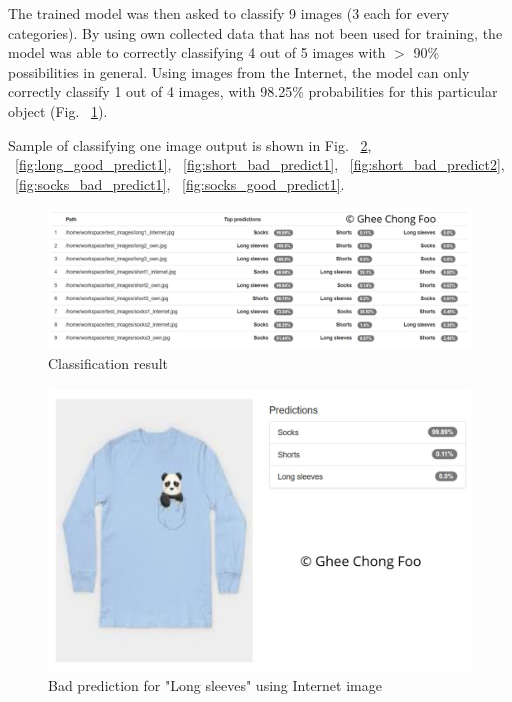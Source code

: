 \documentclass[10pt,journal,compsoc]{IEEEtran}
\begin{document}
The trained model was then asked to classify 9 images (3 each for every categories).  By using own collected data that has not been used for training, the model was able to correctly classifying 4 out of 5 images with $>$ 90\% possibilities in general. Using images from the Internet, the model can only correctly classify 1 out of 4 images, with 98.25\% probabilities for this particular object (Fig. ~\ref{fig:classify_many_clothing}).\linebreak

Sample of classifying one image output is shown in Fig. ~\ref{fig:long_bad_predict1}, ~\ref{fig:long_good_predict1}, ~\ref{fig:short_bad_predict1}, ~\ref{fig:short_bad_predict2}, ~\ref{fig:socks_bad_predict1}, ~\ref{fig:socks_good_predict1}.

\begin{figure}[thpb]
      \centering
      \includegraphics[width=\linewidth]{classify_many_clothing}
      \caption{Classification result}
      \label{fig:classify_many_clothing}
\end{figure}

\begin{figure}[thpb]
      \centering
      \includegraphics[width=\linewidth]{long_bad_predict1}
      \caption{Bad prediction for "Long sleeves" using Internet image}
      \label{fig:long_bad_predict1}
\end{figure}
\end{document}
